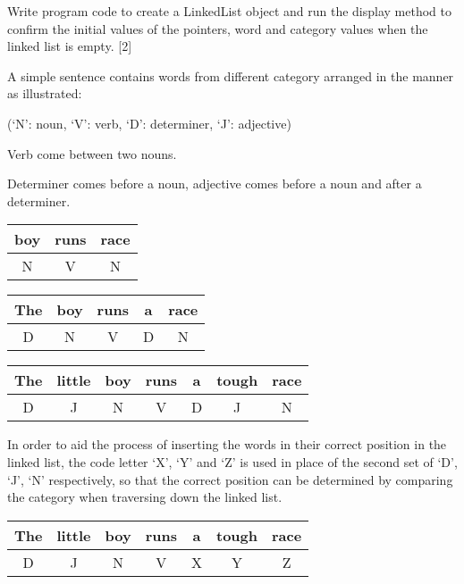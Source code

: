 Write program code to create a LinkedList object and run the display
method to confirm the initial values of the pointers, word and category
values when the linked list is empty. \hfill{}{[}2{]}

A simple sentence contains words from different category arranged
in the manner as illustrated: 

(\textquoteleft N\textquoteright : noun, \textquoteleft V\textquoteright :
verb, \textquoteleft D\textquoteright : determiner, \textquoteleft J\textquoteright :
adjective)

Verb come between two nouns.

Determiner comes before a noun, adjective comes before a noun and
after a determiner.
\noindent \begin{center}
\begin{tabular}{|c|c|c|}
\hline 
boy & runs & race\tabularnewline
\hline 
N & V & N\tabularnewline
\hline 
\end{tabular}
\par\end{center}

\noindent \begin{center}
\begin{tabular}{|c|c|c|c|c|}
\hline 
The & boy  & runs & a & race\tabularnewline
\hline 
D & N & V & D & N\tabularnewline
\hline 
\end{tabular}
\par\end{center}

\noindent \begin{center}
\begin{tabular}{|c|c|c|c|c|c|c|}
\hline 
The & little & boy & runs & a & tough & race\tabularnewline
\hline 
D & J & N & V & D & J & N\tabularnewline
\hline 
\end{tabular}
\par\end{center}

In order to aid the process of inserting the words in their correct
position in the linked list, the code letter \textquoteleft X\textquoteright ,
\textquoteleft Y\textquoteright{} and \textquoteleft Z\textquoteright{}
is used in place of the second set of \textquoteleft D\textquoteright ,
\textquoteleft J\textquoteright , \textquoteleft N\textquoteright{}
respectively, so that the correct position can be determined by comparing
the category when traversing down the linked list.
\noindent \begin{center}
\begin{tabular}{|c|c|c|c|c|c|c|}
\hline 
The & little & boy & runs & a & tough & race\tabularnewline
\hline 
D & J & N & V & X & Y & Z\tabularnewline
\hline 
\end{tabular}
\par\end{center}

